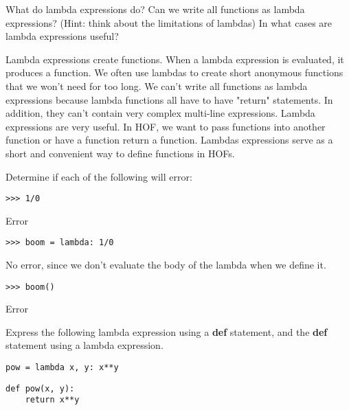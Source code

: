 \question
What do lambda expressions do? Can we write all functions as lambda expressions? (Hint: think about the limitations of lambdas) In what cases are lambda expressions useful? 
\begin{solution}[0.75in]
Lambda expressions create functions. When a lambda expression is evaluated, it produces a function. We often use lambdas to create short anonymous functions that we won't need for too long. \newline We can't write all functions as lambda expressions because lambda functions all have to have "return" statements. In addition, they can't contain very complex multi-line expressions.  \newline Lambda expressions are very useful. In HOF, we want to pass functions into another function or have a function return a function. Lambdas expressions serve as a short and convenient way to define functions in HOFs.
\end{solution}

\question
Determine if each of the following will error: \newline
\begin{lstlisting}
>>> 1/0
\end{lstlisting}
\begin{solution}[0.25in]
Error
\end{solution}
\begin{lstlisting}
>>> boom = lambda: 1/0
\end{lstlisting}
\begin{solution}[0.25in]
No error, since we don't evaluate the body of the lambda when we define it.
\end{solution}
\begin{lstlisting}
>>> boom()
\end{lstlisting}
\begin{solution}[0.25in]
Error
\end{solution}


\question
Express the following lambda expression using a \textbf{def} statement, and the \textbf{def} statement using a lambda expression.
\begin{lstlisting}
pow = lambda x, y: x**y
\end{lstlisting}
\begin{solution}[0.5in]
\begin{verbatim}
def pow(x, y):
    return x**y
\end{verbatim}
\end{solution}


